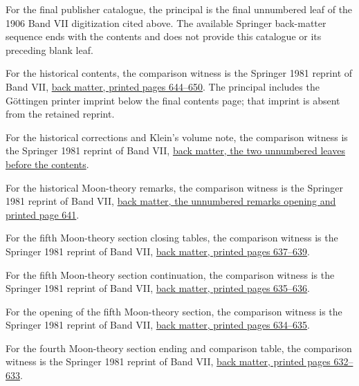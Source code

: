 For the final publisher catalogue, the principal is the final unnumbered leaf of the 1906 Band VII digitization cited above. The available Springer back-matter sequence ends with the contents and does not provide this catalogue or its preceding blank leaf.



For the historical contents, the comparison witness is the Springer 1981 reprint of Band VII, \href{https://link.springer.com/content/pdf/bbm:978-3-642-92478-1/1}{back matter, printed pages 644–650}. The principal includes the Göttingen printer imprint below the final contents page; that imprint is absent from the retained reprint.



For the historical corrections and Klein’s volume note, the comparison witness is the Springer 1981 reprint of Band VII, \href{https://link.springer.com/content/pdf/bbm:978-3-642-92478-1/1}{back matter, the two unnumbered leaves before the contents}.



For the historical Moon-theory remarks, the comparison witness is the Springer 1981 reprint of Band VII, \href{https://link.springer.com/content/pdf/bbm:978-3-642-92478-1/1}{back matter, the unnumbered remarks opening and printed page 641}.



For the fifth Moon-theory section closing tables, the comparison witness is the Springer 1981 reprint of Band VII, \href{https://link.springer.com/content/pdf/bbm:978-3-642-92478-1/1}{back matter, printed pages 637--639}.



For the fifth Moon-theory section continuation, the comparison witness is the Springer 1981 reprint of Band VII, \href{https://link.springer.com/content/pdf/bbm:978-3-642-92478-1/1}{back matter, printed pages 635--636}.



For the opening of the fifth Moon-theory section, the comparison witness is the Springer 1981 reprint of Band VII, \href{https://link.springer.com/content/pdf/bbm:978-3-642-92478-1/1}{back matter, printed pages 634--635}.



For the fourth Moon-theory section ending and comparison table, the comparison witness is the Springer 1981 reprint of Band VII, \href{https://link.springer.com/content/pdf/bbm:978-3-642-92478-1/1}{back matter, printed pages 632--633}.



